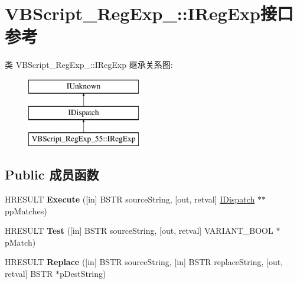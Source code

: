 \hypertarget{interface_v_b_script___reg_exp__55_1_1_i_reg_exp}{}\section{V\+B\+Script\+\_\+\+Reg\+Exp\+\_\+:\+:I\+Reg\+Exp接口 参考}
\label{interface_v_b_script___reg_exp__55_1_1_i_reg_exp}
类 V\+B\+Script\+\_\+\+Reg\+Exp\+\_\+:\+:I\+Reg\+Exp 继承关系图\+:\begin{figure}[H]
\begin{center}
\leavevmode
\includegraphics[height=3.000000cm]{interface_v_b_script___reg_exp__55_1_1_i_reg_exp}
\end{center}
\end{figure}
\subsection*{Public 成员函数}
\begin{DoxyCompactItemize}
\item 
\mbox{\label{interface_v_b_script___reg_exp__55_1_1_i_reg_exp_a9f22b6ec43a79bd78466fc1cbe1173e5}} 
H\+R\+E\+S\+U\+LT {\bfseries Execute} (\mbox{[}in\mbox{]} B\+S\+TR source\+String, \mbox{[}out, retval\mbox{]} \hyperlink{interface_i_dispatch}{I\+Dispatch} $\ast$$\ast$pp\+Matches)
\item 
\mbox{\label{interface_v_b_script___reg_exp__55_1_1_i_reg_exp_abb400c9bbc144e1ce0125606593c1397}} 
H\+R\+E\+S\+U\+LT {\bfseries Test} (\mbox{[}in\mbox{]} B\+S\+TR source\+String, \mbox{[}out, retval\mbox{]} V\+A\+R\+I\+A\+N\+T\+\_\+\+B\+O\+OL $\ast$p\+Match)
\item 
\mbox{\label{interface_v_b_script___reg_exp__55_1_1_i_reg_exp_ac2e9611aca15ca66fd9a4c479144b1d6}} 
H\+R\+E\+S\+U\+LT {\bfseries Replace} (\mbox{[}in\mbox{]} B\+S\+TR source\+String, \mbox{[}in\mbox{]} B\+S\+TR replace\+String, \mbox{[}out, retval\mbox{]} B\+S\+TR $\ast$p\+Dest\+String)
\end{DoxyCompactItemize}
